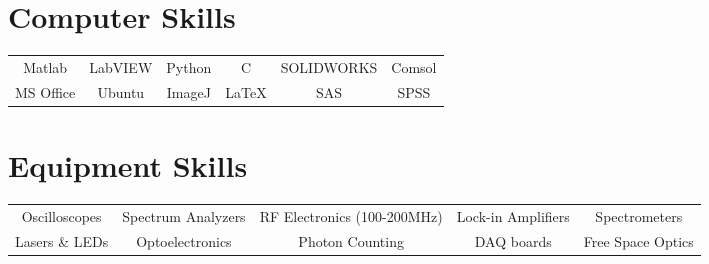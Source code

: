 \documentclass{my_cv}
\begin{document}

\vspace{-7mm} %


\section{Computer Skills}

\vspace{2pt} %
\begin{center}

\begin{tabular}{c|c|c|c|c|c} Matlab & LabVIEW& Python & C &SOLIDWORKS &Comsol \\
MS Office& Ubuntu & ImageJ &\LaTeX &SAS &SPSS\end{tabular}
\end{center}


\vspace{-7mm}  %

\section{Equipment Skills}

\vspace{2pt} %
\begin{center}

\begin{tabular}{c|c|c|c|c} Oscilloscopes & Spectrum Analyzers & RF Electronics (100-200MHz) & Lock-in Amplifiers &Spectrometers\\
Lasers \& LEDs & Optoelectronics &Photon Counting &DAQ boards &Free Space Optics\end{tabular}
\end{center}


\vspace{-7mm}  %
\end{document}
